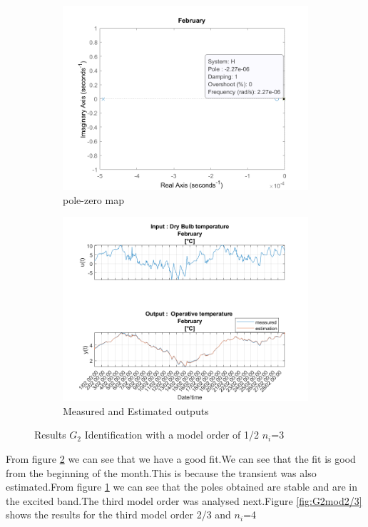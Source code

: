 \documentclass[a4paper,12pt]{report}
\numberwithin{equation}{section}
\begin{document}
\begin{figure}[H]
\centering
\begin{subfigure}{\textwidth}
  \centering
  \includegraphics[width=.7\linewidth]{G2mod12pzmap.png}
  \caption{pole-zero map}
  \label{fig:pzmap G2mod1/2}
\end{subfigure}

\begin{subfigure}{\textwidth}
  \centering
  \includegraphics[width=.8\linewidth]{G2mod12InOut.png}
  \caption{Measured and Estimated outputs}
  \label{fig:inoutG21/2}
\end{subfigure}
\caption{Results $G_{2}$ Identification with a model order of 1/2 $n_{i}$=3 }
\label{fig:G2mod1/2}
\end{figure}

\noindent
From figure \ref{fig:inoutG21/2} we can see that we have a good fit.We can see that the fit is good from the beginning of the month.This is because the transient was also estimated.From figure \ref{fig:pzmap G2mod1/2} we can see that the poles obtained are stable and are in the excited band.The third model order was analysed next.Figure \ref{fig:G2mod2/3} shows the results for the third model order 2/3 and $n_{i}$=4
\end{document}

